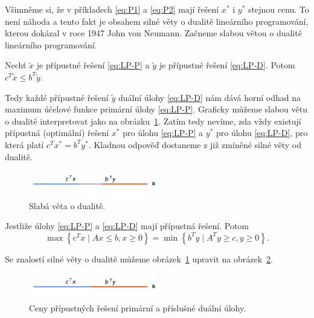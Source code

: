 Všimněme si, že v příkladech \ref{eq:P1} a \ref{eq:P2} mají řešení $x^*$ i $y^*$ stejnou cenu. To není náhoda a tento fakt je obsahem silné věty o dualitě lineárního programování, kterou dokázal v roce 1947 John von Neumann. Začneme slabou větou o dualitě lineárního programování.

\begin{vt2}
    Nechť $\tilde{x}$ je přípustné řešení \ref{eq:LP-P} a $\tilde{y}$ je přípustné řešení \ref{eq:LP-D}. Potom $c^T \tilde{x} \leq b^T \tilde{y}$.
\end{vt2}

Tedy každé přípustné řešení $\tilde{y}$ duální úlohy \ref{eq:LP-D} nám dává horní odhad na maximum účelové funkce primární úlohy \ref{eq:LP-P}. Graficky můžeme slabou větu o dualitě interpretovat jako na obrázku~\ref{fig:weak_duality}. Zatím tedy nevíme, zda vždy existují přípustná (optimální) řešení $x^*$ pro úlohu \ref{eq:LP-P} a $y^*$ pro úlohu \ref{eq:LP-D}, pro která platí $c^T x^* = b^T y^*$. Kladnou odpověď dostaneme z již zmíněné silné věty od dualitě.

\begin{figure}[h!]
    \centering
    \includegraphics[width=0.5\textwidth]{img/weak_duality.png}   
    \caption{Slabá věta o dualitě.}
    \label{fig:weak_duality}
\end{figure}

\begin{vt2}
    Jestliže úlohy \ref{eq:LP-P} a \ref{eq:LP-D} mají přípustná řešení. Potom
    $$
        \max \left\{ c^T x \mid Ax \leq b, x \geq 0 \right\} = \min \left\{ b^T y \mid A^T y \geq c, y \geq 0 \right\}.
    $$ 
\end{vt2}
Se znalostí silné věty o dualitě můžeme obrázek~\ref{fig:weak_duality} upravit na obrázek~\ref{fig:strong_duality}.

\begin{figure}[h!]
    \centering
    \includegraphics[width=0.5\textwidth]{img/strong_duality.png}
    \caption{Ceny přípustných řešení primární a příslušné duální úlohy.}
    \label{fig:strong_duality}
\end{figure}

